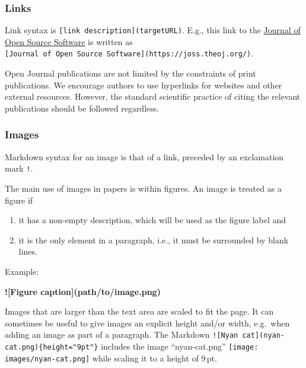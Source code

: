 \documentclass[10pt,a4paper,onecolumn]{article}
\newenvironment{Shaded}{}{}
\newcommand{\AlertTok}[1]{\textcolor[rgb]{1.00,0.00,0.00}{\textbf{#1}}}
\providecommand{\tightlist}{%
  \setlength{\itemsep}{0pt}\setlength{\parskip}{0pt}}
\begin{document}
\subsubsection{Links}\label{links}

Link syntax is \texttt{{[}link\ description{]}(targetURL)}. E.g., this
link to the \href{https://joss.theoj.org/}{Journal of Open Source
Software} is written as\\
\texttt{{[}Journal\ of\ Open\ Source\ Software{]}(https://joss.theoj.org/)}.

Open Journal publications are not limited by the constraints of print
publications. We encourage authors to use hyperlinks for websites and
other external resources. However, the standard scientific practice of
citing the relevant publications should be followed regardless.

\subsubsection{Images}\label{images}

Markdown syntax for an image is that of a link, preceded by an
exclamation mark \texttt{!}.

The main use of images in papers is within figures. An image is treated
as a figure if

\begin{enumerate}
\def\labelenumi{\arabic{enumi}.}
\tightlist
\item
  it has a non-empty description, which will be used as the figure label
  and
\item
  it is the only element in a paragraph, i.e., it must be surrounded by
  blank lines.
\end{enumerate}

Example:

\begin{Shaded}
\begin{Highlighting}[]
\AlertTok{![Figure caption](path/to/image.png)}
\end{Highlighting}
\end{Shaded}

Images that are larger than the text area are scaled to fit the page. It
can sometimes be useful to give images an explicit height and/or width,
e.g.~when adding an image as part of a paragraph. The Markdown
\texttt{!{[}Nyan\ cat{]}(nyan-cat.png)\{height="9pt"\}} includes the
image ``nyan-cat.png''
\texttt{[image: images/nyan-cat.png]}
while scaling it to a height of 9\,pt.
\end{document}
